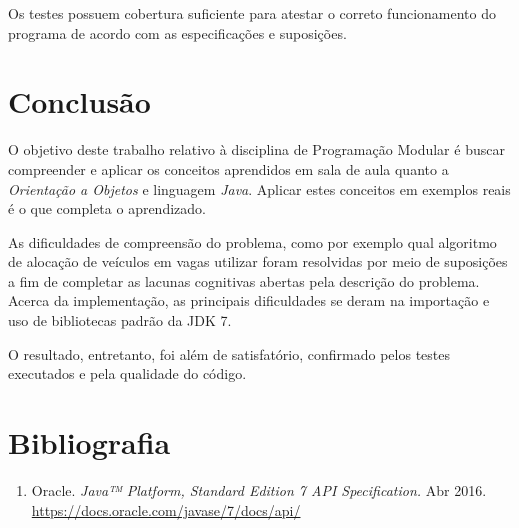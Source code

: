 \documentclass[a4paper,12pt]{article}
\begin{document}
Os testes possuem cobertura suficiente para atestar o correto funcionamento do programa de acordo com as especificações e suposições.

\section{Conclusão}

O objetivo deste trabalho relativo à disciplina de Programação Modular é buscar compreender e aplicar os conceitos aprendidos em sala de aula quanto a \emph{Orientação a Objetos} e linguagem \emph{Java}. Aplicar estes conceitos em exemplos reais é o que completa o aprendizado.

As dificuldades de compreensão do problema, como por exemplo qual algoritmo de alocação de veículos em vagas utilizar foram resolvidas por meio de suposições a fim de completar as lacunas cognitivas abertas pela descrição do problema. Acerca da implementação, as principais dificuldades se deram na importação e uso de bibliotecas padrão da JDK 7.

O resultado, entretanto, foi além de satisfatório, confirmado pelos testes executados e pela qualidade do código.

\section{Bibliografia}

\begin{enumerate}
    \item Oracle. \emph{Java™ Platform, Standard Edition 7 API Specification.} Abr 2016. \url{https://docs.oracle.com/javase/7/docs/api/}
\end{enumerate}
\end{document}
